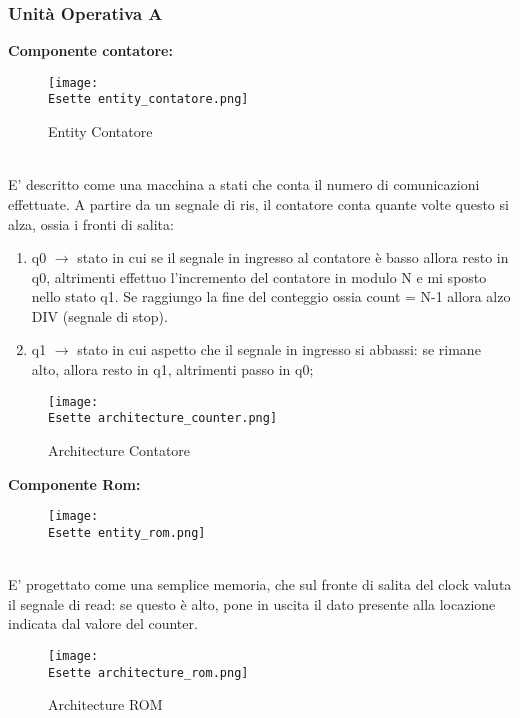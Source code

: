 \documentclass[12pt]{article}
\def \Esette {Allegati/Esercizio7/}
\begin{document}
\subsubsection{Unità Operativa A}
{\large \textbf{Componente contatore:}}
\begin{figure}[ht!]
    \centering
    \texttt{[image: \\Esette entity\_contatore.png]}
    \caption{Entity Contatore}
\end{figure}
\\E' descritto come una macchina a stati che conta il numero di comunicazioni effettuate. A partire da un segnale di ris, il contatore conta quante volte questo si alza, ossia i fronti di salita:
\begin{enumerate}
    \item q0 $\rightarrow$ stato in cui se il segnale in ingresso al contatore è basso allora resto in q0, altrimenti effettuo l'incremento del contatore in modulo N e mi sposto nello stato q1. Se raggiungo la fine del conteggio ossia count = N-1 allora alzo DIV (segnale di stop).
    \item q1 $\rightarrow$ stato in cui aspetto che il segnale in ingresso si abbassi: se rimane alto, allora resto in q1, altrimenti passo in q0;
\end{enumerate}
\begin{figure}[ht!]
    \centering
    \texttt{[image: \\Esette architecture\_counter.png]}
    \caption{Architecture Contatore}
\end{figure}
\clearpage
{\large \textbf{Componente Rom:}}
\begin{figure}[ht]
    \centering
    \texttt{[image: \\Esette entity\_rom.png]}
\end{figure}
\\E' progettato come una semplice memoria, che sul fronte di salita del clock valuta il segnale di read: se questo è alto, pone in uscita il dato presente alla locazione indicata dal valore del counter.
\begin{figure}[ht!]
    \centering
    \texttt{[image: \\Esette architecture\_rom.png]}
    \caption{Architecture ROM}
\end{figure}
\clearpage
\end{document}
